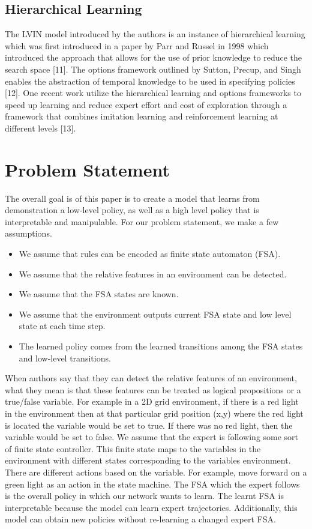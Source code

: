 \documentclass[letterpaper, 10 pt, conference]{ieeeconf}  %
\begin{document}
\subsection{Hierarchical Learning}

The LVIN model introduced by the authors is an instance of hierarchical learning which was first introduced in a paper by Parr and Russel in 1998 which introduced the approach that allows for the use of prior knowledge to reduce the search space [11]. The options framework outlined by Sutton, Precup, and Singh enables the abstraction of temporal knowledge to be used in specifying policies [12]. One recent work utilize the hierarchical learning and options frameworks to speed up learning and reduce expert effort and cost of exploration through a framework that combines imitation learning and reinforcement learning at different levels [13].

\section{Problem Statement}
The overall goal is of this paper is to create a model that learns from demonstration a low-level policy, as well as a high level policy that is interpretable and manipulable. For our problem statement, we make a few assumptions. 
\begin{itemize}
  \item We assume that rules can be encoded as finite state automaton (FSA). 
  \item We assume that the relative features in an environment can be detected.
  \item We assume that the FSA states are known.
  \item We assume that the environment outputs current FSA state and low level state at each time step.
  \item The learned policy comes from the learned transitions among the FSA states and low-level transitions.
\end{itemize}

When authors say that they can detect the relative features of an environment, what they mean is that these features can be treated as logical propositions or a true/false variable. For example in a 2D grid environment, if there is a red light in the environment then at that particular grid position (x,y) where the red light is located the variable would be set to true. If there was no red light, then the variable would be set to false.
\newline
\indent We assume that the expert is following some sort of finite state controller. This finite state maps to the variables in the environment with different states corresponding to the variables environment. There are different actions based on the variable. For example, move forward on a green light as an action in the state machine. The FSA which the expert follows is the overall policy in which our network wants to learn. The learnt FSA is interpretable because the model can learn expert trajectories. Additionally, this model can obtain new policies without re-learning a changed expert FSA.
\end{document}
